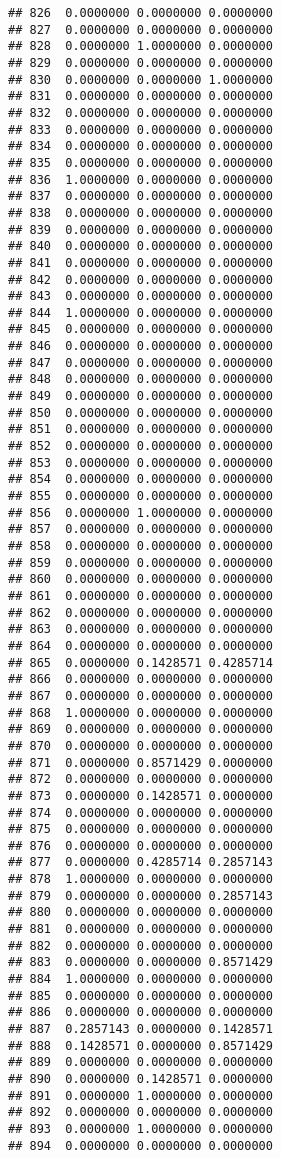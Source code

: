 \documentclass[
]{article}
\begin{document}
\begin{verbatim}
## 826  0.0000000 0.0000000 0.0000000
## 827  0.0000000 0.0000000 0.0000000
## 828  0.0000000 1.0000000 0.0000000
## 829  0.0000000 0.0000000 0.0000000
## 830  0.0000000 0.0000000 1.0000000
## 831  0.0000000 0.0000000 0.0000000
## 832  0.0000000 0.0000000 0.0000000
## 833  0.0000000 0.0000000 0.0000000
## 834  0.0000000 0.0000000 0.0000000
## 835  0.0000000 0.0000000 0.0000000
## 836  1.0000000 0.0000000 0.0000000
## 837  0.0000000 0.0000000 0.0000000
## 838  0.0000000 0.0000000 0.0000000
## 839  0.0000000 0.0000000 0.0000000
## 840  0.0000000 0.0000000 0.0000000
## 841  0.0000000 0.0000000 0.0000000
## 842  0.0000000 0.0000000 0.0000000
## 843  0.0000000 0.0000000 0.0000000
## 844  1.0000000 0.0000000 0.0000000
## 845  0.0000000 0.0000000 0.0000000
## 846  0.0000000 0.0000000 0.0000000
## 847  0.0000000 0.0000000 0.0000000
## 848  0.0000000 0.0000000 0.0000000
## 849  0.0000000 0.0000000 0.0000000
## 850  0.0000000 0.0000000 0.0000000
## 851  0.0000000 0.0000000 0.0000000
## 852  0.0000000 0.0000000 0.0000000
## 853  0.0000000 0.0000000 0.0000000
## 854  0.0000000 0.0000000 0.0000000
## 855  0.0000000 0.0000000 0.0000000
## 856  0.0000000 1.0000000 0.0000000
## 857  0.0000000 0.0000000 0.0000000
## 858  0.0000000 0.0000000 0.0000000
## 859  0.0000000 0.0000000 0.0000000
## 860  0.0000000 0.0000000 0.0000000
## 861  0.0000000 0.0000000 0.0000000
## 862  0.0000000 0.0000000 0.0000000
## 863  0.0000000 0.0000000 0.0000000
## 864  0.0000000 0.0000000 0.0000000
## 865  0.0000000 0.1428571 0.4285714
## 866  0.0000000 0.0000000 0.0000000
## 867  0.0000000 0.0000000 0.0000000
## 868  1.0000000 0.0000000 0.0000000
## 869  0.0000000 0.0000000 0.0000000
## 870  0.0000000 0.0000000 0.0000000
## 871  0.0000000 0.8571429 0.0000000
## 872  0.0000000 0.0000000 0.0000000
## 873  0.0000000 0.1428571 0.0000000
## 874  0.0000000 0.0000000 0.0000000
## 875  0.0000000 0.0000000 0.0000000
## 876  0.0000000 0.0000000 0.0000000
## 877  0.0000000 0.4285714 0.2857143
## 878  1.0000000 0.0000000 0.0000000
## 879  0.0000000 0.0000000 0.2857143
## 880  0.0000000 0.0000000 0.0000000
## 881  0.0000000 0.0000000 0.0000000
## 882  0.0000000 0.0000000 0.0000000
## 883  0.0000000 0.0000000 0.8571429
## 884  1.0000000 0.0000000 0.0000000
## 885  0.0000000 0.0000000 0.0000000
## 886  0.0000000 0.0000000 0.0000000
## 887  0.2857143 0.0000000 0.1428571
## 888  0.1428571 0.0000000 0.8571429
## 889  0.0000000 0.0000000 0.0000000
## 890  0.0000000 0.1428571 0.0000000
## 891  0.0000000 1.0000000 0.0000000
## 892  0.0000000 0.0000000 0.0000000
## 893  0.0000000 1.0000000 0.0000000
## 894  0.0000000 0.0000000 0.0000000

\end{verbatim}
\end{document}
